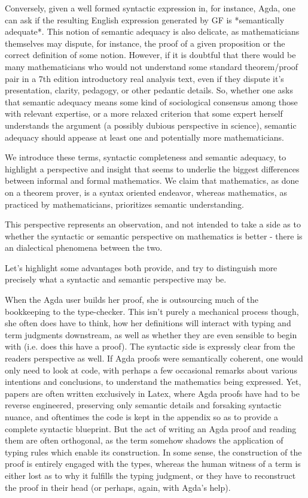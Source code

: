 \documentclass[11pt, a4paper]{article}
\begin{document}
Conversely, given a well formed syntactic expression in, for instance, Agda, one
can ask if the resulting English expression generated by GF is *semantically
adequate*. This notion of semantic adequacy is also delicate, as mathematicians
themselves may dispute, for instance, the proof of a given proposition or the
correct definition of some notion. However, if it is doubtful that there would
be many mathematicians who would not understand some standard theorem/proof pair
in a 7th edition introductory real analysis text, even if they dispute it's
presentation, clarity, pedagogy, or other pedantic details. So, whether one asks
that semantic adequacy means some kind of sociological consensus among those
with relevant expertise, or a more relaxed criterion that some expert herself
understands the argument (a possibly dubious perspective in science), semantic
adequacy should appease at least one and potentially more mathematicians.

We introduce these terms, syntactic completeness and semantic adequacy, to
highlight a perspective and insight that seems to underlie the biggest
differences between informal and formal mathematics. We claim that mathematics,
as done on a theorem prover, is a syntax oriented endeavor, whereas mathematics,
as practiced by mathematicians, prioritizes semantic understanding.

This perspective represents an observation, and not intended to take a side as
to whether the syntactic or semantic perspective on mathematics is better -
there is an dialectical phenomena between the two.

Let's highlight some advantages both provide, and try to distinguish more
precisely what a syntactic and semantic perspective may be.

When the Agda user builds her proof, she is outsourcing much of the bookkeeping
to the type-checker. This isn't purely a mechanical process though, she often
does have to think, how her definitions will interact with typing and term
judgments downstream, as well as whether they are even sensible to begin with
(i.e. does this have a proof). The syntactic side is expressly clear from the
readers perspective as well. If Agda proofs were semantically coherent, one
would only need to look at code, with perhaps a few occasional remarks about
various intentions and conclusions, to understand the mathematics being
expressed. Yet, papers are often written exclusively in Latex, where Agda proofs
have had to be reverse engineered, preserving only semantic details and
forsaking syntactic nuance, and oftentimes the code is kept in the appendix so
as to provide a complete syntactic blueprint. But the act of writing an Agda
proof and reading them are often orthogonal, as the term somehow shadows the
application of typing rules which enable its construction. In some sense, the
construction of the proof is entirely engaged with the types, whereas the human
witness of a term is either lost as to why it fulfills the typing judgment, or
they have to reconstruct the proof in their head (or perhaps, again, with Agda's
help).
\end{document}
